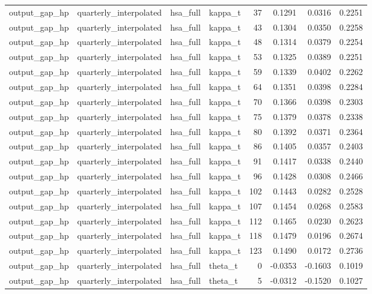 \begin{tabular}{llllrrrr}
output\_gap\_hp & quarterly\_interpolated & hsa\_full & kappa\_t & 37 & 0.1291 & 0.0316 & 0.2251 \\
output\_gap\_hp & quarterly\_interpolated & hsa\_full & kappa\_t & 43 & 0.1304 & 0.0350 & 0.2258 \\
output\_gap\_hp & quarterly\_interpolated & hsa\_full & kappa\_t & 48 & 0.1314 & 0.0379 & 0.2254 \\
output\_gap\_hp & quarterly\_interpolated & hsa\_full & kappa\_t & 53 & 0.1325 & 0.0389 & 0.2251 \\
output\_gap\_hp & quarterly\_interpolated & hsa\_full & kappa\_t & 59 & 0.1339 & 0.0402 & 0.2262 \\
output\_gap\_hp & quarterly\_interpolated & hsa\_full & kappa\_t & 64 & 0.1351 & 0.0398 & 0.2284 \\
output\_gap\_hp & quarterly\_interpolated & hsa\_full & kappa\_t & 70 & 0.1366 & 0.0398 & 0.2303 \\
output\_gap\_hp & quarterly\_interpolated & hsa\_full & kappa\_t & 75 & 0.1379 & 0.0378 & 0.2338 \\
output\_gap\_hp & quarterly\_interpolated & hsa\_full & kappa\_t & 80 & 0.1392 & 0.0371 & 0.2364 \\
output\_gap\_hp & quarterly\_interpolated & hsa\_full & kappa\_t & 86 & 0.1405 & 0.0357 & 0.2403 \\
output\_gap\_hp & quarterly\_interpolated & hsa\_full & kappa\_t & 91 & 0.1417 & 0.0338 & 0.2440 \\
output\_gap\_hp & quarterly\_interpolated & hsa\_full & kappa\_t & 96 & 0.1428 & 0.0308 & 0.2466 \\
output\_gap\_hp & quarterly\_interpolated & hsa\_full & kappa\_t & 102 & 0.1443 & 0.0282 & 0.2528 \\
output\_gap\_hp & quarterly\_interpolated & hsa\_full & kappa\_t & 107 & 0.1454 & 0.0268 & 0.2583 \\
output\_gap\_hp & quarterly\_interpolated & hsa\_full & kappa\_t & 112 & 0.1465 & 0.0230 & 0.2623 \\
output\_gap\_hp & quarterly\_interpolated & hsa\_full & kappa\_t & 118 & 0.1479 & 0.0196 & 0.2674 \\
output\_gap\_hp & quarterly\_interpolated & hsa\_full & kappa\_t & 123 & 0.1490 & 0.0172 & 0.2736 \\
output\_gap\_hp & quarterly\_interpolated & hsa\_full & theta\_t & 0 & -0.0353 & -0.1603 & 0.1019 \\
output\_gap\_hp & quarterly\_interpolated & hsa\_full & theta\_t & 5 & -0.0312 & -0.1520 & 0.1027 \\

\end{tabular}

